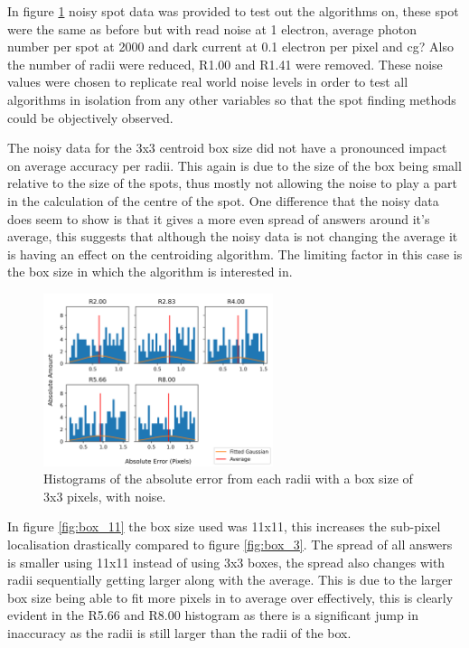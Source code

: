 \documentclass[aps,pra,a4paper,nofootinbib,onecolumn,tightenlines,longbibliography,12pt,amsfonts,amssymb,amsmath,floatfix]{revtex4-2} %
\begin{document}
  In figure \ref{fig:box_3_noise} noisy spot data was provided to test out the algorithms on, 
  these spot were the same as before but with read noise at 1 electron, average photon number 
  per spot at 2000 and dark current at 0.1 electron per pixel and cg? Also the number of radii 
  were reduced, R1.00 and R1.41 were removed. These noise values were chosen 
  to replicate real world noise levels in order to test all algorithms in isolation from any other 
  variables so that the spot finding methods could be objectively observed. 

  The noisy data for the 3x3 centroid box size did not have a pronounced impact on average 
  accuracy per radii. This again is due to the size of the box being small relative to the 
  size of the spots, thus mostly not allowing the noise to play a part in the calculation of the 
  centre of the spot. One difference that the noisy data does seem to show is that it gives a more 
  even spread of answers around it's average, this suggests that although the noisy data 
  is not changing the average it is having an effect on the centroiding algorithm. The limiting factor 
  in this case is the box size in which the algorithm is interested in.

  \begin{figure}[h]
    \begin{center}
      \includegraphics[width=0.6\textwidth]{project_pics/noise_cen_scatter_3.png}
    \end{center}
    \caption{Histograms of the absolute error from each radii with a box size of 3x3 pixels, with noise.}
    \label{fig:box_3_noise}
  \end{figure}
  


  In figure \ref{fig:box_11} the box size used was 11x11, this increases the sub-pixel localisation 
  drastically compared to figure \ref{fig:box_3}. The spread of all answers is smaller using 11x11 instead of using 3x3
  boxes, the spread also changes with radii sequentially getting larger along with the average. 
  This is due to the larger box size being able to fit 
  more pixels in to average over effectively, this is clearly evident in the R5.66 and R8.00 histogram as there is a 
  significant jump in inaccuracy as the radii is still larger than the radii of the box. 
\end{document}
